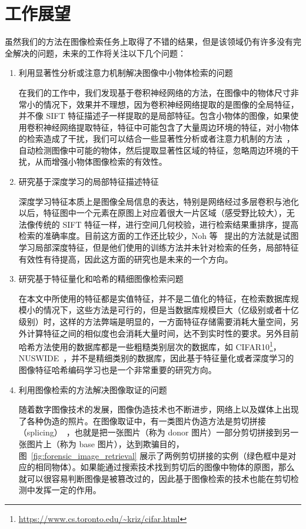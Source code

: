\section{工作展望}
虽然我们的方法在图像检索任务上取得了不错的结果，但是该领域仍有许多没有完全解决的问题，未来的工作将关注以下几个问题：

\begin{enumerate}
\item 利用显著性分析或注意力机制解决图像中小物体检索的问题

在我们的工作中，我们发现基于卷积神经网络的方法，在图像中的物体尺寸非常小的情况下，效果并不理想，因为卷积神经网络提取的是图像的全局特征，并不像 SIFT 特征描述子一样提取的是局部特征。包含小物体的图像，如果使用卷积神经网络提取特征，特征中可能包含了大量周边环境的特征，对小物体的检索造成了干扰，我们可以结合一些显著性分析或者注意力机制的方法~\cite{Song2017DeepSA}，自动检测图像中可能的物体，然后提取显著性区域的特征，忽略周边环境的干扰，从而增强小物体图像检索的有效性。

\item 研究基于深度学习的局部特征描述特征

深度学习特征本质上是图像全局信息的表达，特别是网络经过多层卷积与池化以后，特征图中一个元素在原图上对应着很大一片区域（感受野比较大），无法像传统的 SIFT 特征一样，进行空间几何校验，进行检索结果重排序，提高检索的准确率度。目前这方面的工作还比较少，Noh 等~\cite{Noh2017LargeScaleIR} 提出的方法就是试图学习局部深度特征，但是他们使用的训练方法并未针对检索的任务，局部特征有效性有待提高，因此这方面的研究也是未来的一个方向。

\item 研究基于特征量化和哈希的精细图像检索问题

在本文中所使用的特征都是实值特征，并不是二值化的特征，在检索数据库规模小的情况下，这些方法是可行的，但是当数据库规模巨大（亿级别或者十亿级别）时，这样的方法弊端是明显的，一方面特征存储需要消耗大量空间，另外计算特征之间的相似度也会消耗大量时间，达不到实时性的要求。另外目前哈希方法使用的数据库都是一些粗糙类别层次的数据库，如 CIFAR10\footnote{\url{https://www.cs.toronto.edu/~kriz/cifar.html}}，NUSWIDE~\cite{Chua2009NUSWIDEAR}，并不是精细类别的数据库，因此基于特征量化或者深度学习的图像特征哈希编码学习也是一个非常重要的研究方向。

\item 利用图像检索的方法解决图像取证的问题

随着数字图像技术的发展，图像伪造技术也不断进步，网络上以及媒体上出现了各种伪造的照片。在图像取证中，有一类图片伪造方法是剪切拼接（splicing）~\cite{Farid2009ImageFD}，也就是把一张图片（称为 donor 图片）一部分剪切拼接到另一张图片上（称为 base 图片），达到欺骗目的，图~\ref{fig:forensic_image_retrieval} 展示了两例剪切拼接的实例（绿色框中是对应的相同物体）。如果能通过搜索技术找到剪切后的图像中物体的原图，那么就可以很容易判断图像是被篡改过的，因此基于图像检索的技术也能在剪切检测中发挥一定的作用。
\end{enumerate}







